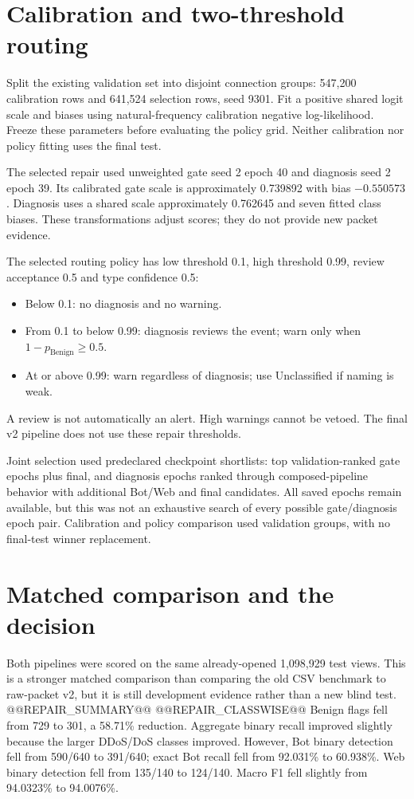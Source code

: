 \documentclass[11pt,a4paper,oneside]{report}
\begin{document}
\section{Calibration and two-threshold routing}
Split the existing validation set into disjoint connection groups: 547,200 calibration rows and 641,524 selection rows, seed 9301. Fit a positive shared logit scale and biases using natural-frequency calibration negative log-likelihood. Freeze these parameters before evaluating the policy grid. Neither calibration nor policy fitting uses the final test.

The selected repair used unweighted gate seed 2 epoch 40 and diagnosis seed 2 epoch 39. Its calibrated gate scale is approximately 0.739892 with bias $-0.550573$. Diagnosis uses a shared scale approximately 0.762645 and seven fitted class biases. These transformations adjust scores; they do not provide new packet evidence.

The selected routing policy has low threshold 0.1, high threshold 0.99, review acceptance 0.5 and type confidence 0.5:
\begin{itemize}
\item Below 0.1: no diagnosis and no warning.
\item From 0.1 to below 0.99: diagnosis reviews the event; warn only when $1-p_{\mathrm{Benign}}\geq0.5$.
\item At or above 0.99: warn regardless of diagnosis; use Unclassified if naming is weak.
\end{itemize}
A review is not automatically an alert. High warnings cannot be vetoed. The final v2 pipeline does not use these repair thresholds.

Joint selection used predeclared checkpoint shortlists: top validation-ranked gate epochs plus final, and diagnosis epochs ranked through composed-pipeline behavior with additional Bot/Web and final candidates. All saved epochs remain available, but this was not an exhaustive search of every possible gate/diagnosis epoch pair. Calibration and policy comparison used validation groups, with no final-test winner replacement.

\section{Matched comparison and the decision}
Both pipelines were scored on the same already-opened 1,098,929 test views. This is a stronger matched comparison than comparing the old CSV benchmark to raw-packet v2, but it is still development evidence rather than a new blind test.
@@REPAIR_SUMMARY@@
@@REPAIR_CLASSWISE@@
Benign flags fell from 729 to 301, a 58.71\% reduction. Aggregate binary recall improved slightly because the larger DDoS/DoS classes improved. However, Bot binary detection fell from 590/640 to 391/640; exact Bot recall fell from 92.031\% to 60.938\%. Web binary detection fell from 135/140 to 124/140. Macro F1 fell slightly from 94.0323\% to 94.0076\%.
\end{document}
